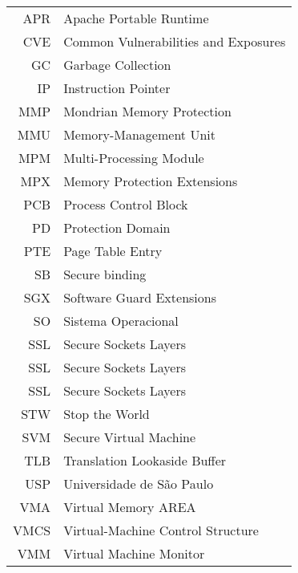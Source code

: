 {
\raggedbottom


\begin{tabular}{rl}
  APR      & Apache Portable Runtime \\
  CVE      & Common Vulnerabilities and Exposures\\
  GC       & Garbage Collection \\
  IP       & Instruction Pointer\\
  MMP      & Mondrian Memory Protection\\
  MMU      & Memory-Management Unit\\
  MPM      & Multi-Processing Module \\
  MPX      & Memory Protection Extensions\\
  PCB      & Process Control Block\\
  PD       & Protection Domain\\
  PTE      & Page Table Entry\\
  SB       & Secure binding \\
  SGX      & Software Guard Extensions\\
  SO       & Sistema Operacional\\
  SSL      & Secure Sockets Layers\\
  SSL      & Secure Sockets Layers\\
  SSL      & Secure Sockets Layers\\
  STW      & Stop the World\\
  SVM      & Secure Virtual Machine\\
  TLB      & Translation Lookaside Buffer \\
  USP      & Universidade de São Paulo \\
  VMA      & Virtual Memory AREA\\
  VMCS     & Virtual-Machine Control Structure\\
  VMM      & Virtual Machine Monitor
\end{tabular}

}
